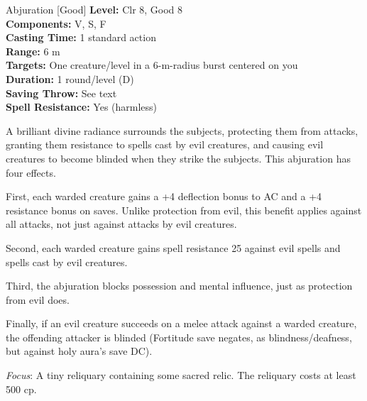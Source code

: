 {Abjuration [Good]}
{
	\textbf{Level:}
	Clr 8, Good 8\\
	\textbf{Components:}
	V, S, F\\
	\textbf{Casting Time:}
	1 standard action\\
	\textbf{Range:}
	6 m\\
	\textbf{Targets:}
	One creature/level in a 6-m-radius burst centered on you\\
	\textbf{Duration:}
	1 round/level (D)\\
	\textbf{Saving Throw:}
	See text\\
	\textbf{Spell Resistance:}
	Yes (harmless)\\
}
{
	A brilliant divine radiance surrounds the subjects, protecting them from attacks, granting them resistance to spells cast by evil creatures, and causing evil creatures to become blinded when they strike the subjects. This abjuration has four effects.

	First, each warded creature gains a +4 deflection bonus to AC and a +4 resistance bonus on saves. Unlike protection from evil, this benefit applies against all attacks, not just against attacks by evil creatures.

	Second, each warded creature gains spell resistance 25 against evil spells and spells cast by evil creatures.

	Third, the abjuration blocks possession and mental influence, just as protection from evil does.

	Finally, if an evil creature succeeds on a melee attack against a warded creature, the offending attacker is blinded (Fortitude save negates, as blindness/deafness, but against holy aura's save DC).

	\textit{Focus}:
	A tiny reliquary containing some sacred relic. The reliquary costs at least 500 cp.

}
